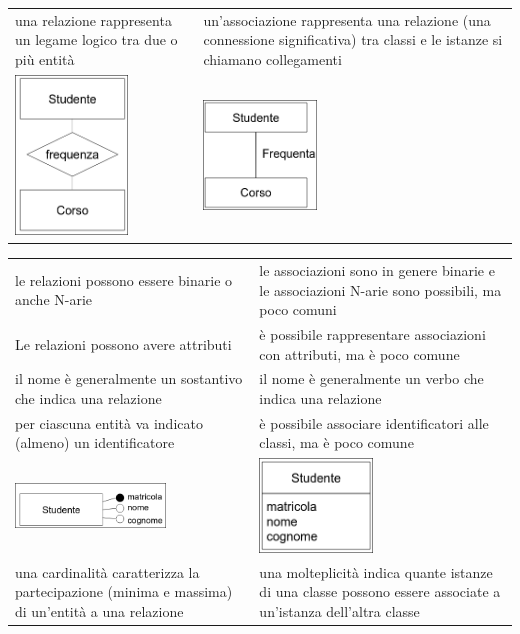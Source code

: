 \documentclass{article}
\begin{document}
\begin{center}
\begin{tabular}{p{}|p{}}
        una relazione rappresenta un legame logico tra due o più entità & un'associazione rappresenta una relazione (una connessione significativa) tra classi e le istanze si chiamano collegamenti\\
        \includegraphics[width=3cm]{images/er3.png} & \includegraphics[width=3cm]{images/uml3.png}
    \end{tabular}
    \begin{tabular}{p{}|p{}}
        le relazioni possono essere binarie o anche N-arie & le associazioni sono in genere binarie e le associazioni N-arie sono possibili, ma poco comuni\\
        Le relazioni possono avere attributi & è possibile rappresentare associazioni con attributi, ma è poco comune\\
        il nome è generalmente un sostantivo che indica una relazione & il nome è generalmente un verbo che indica una relazione\\
        per ciascuna entità va indicato (almeno) un identificatore & è possibile associare identificatori alle classi, ma è poco comune\\
        \includegraphics[width=4cm]{images/er4.png} & \includegraphics[width=3cm]{images/uml4.png}\\
        una cardinalità caratterizza la partecipazione (minima e massima) di un'entità a una relazione & una molteplicità indica quante istanze di una classe possono essere associate a un'istanza dell'altra classe\\

\end{tabular}
\end{center}
\end{document}
